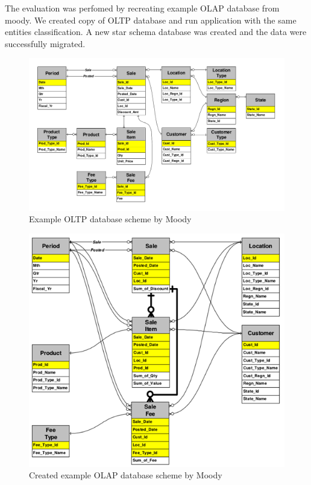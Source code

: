 The evaluation was perfomed by recreating example OLAP database from moody.
We created copy of OLTP database and run application with the same entities classification.
A new star schema database was created and the data were successfully migrated.
\begin{figure}
  \centering
  \includegraphics[width=\linewidth]{images/exampleDatabase}
  \caption{Example OLTP database scheme by Moody \andothers \cite{moody2000enterprise}}
  \label{fig:exampleDatabase}
\end{figure}

\begin{figure}
  \centering
  \includegraphics[width=\linewidth]{images/exampleDatabaseStarModel}
  \caption{Created example OLAP database scheme by Moody \andothers \cite{moody2000enterprise}}
  \label{fig:exampleDatabaseStarModel}
\end{figure}
